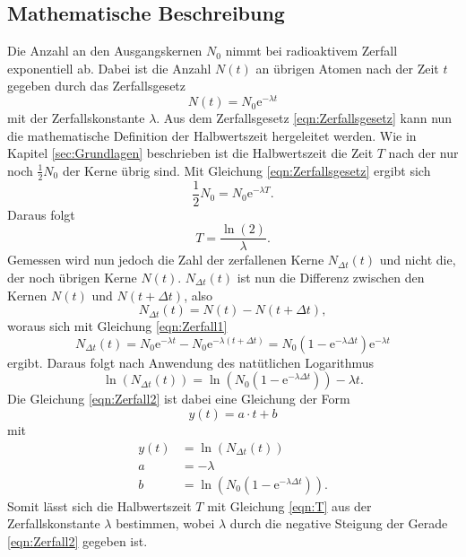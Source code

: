 \subsection{Mathematische Beschreibung}
\label{sec:mathe}
Die Anzahl an den Ausgangskernen $N_0$ nimmt bei radioaktivem Zerfall exponentiell ab. Dabei ist die 
Anzahl $N(t)$ an übrigen Atomen nach der Zeit $t$ gegeben durch das Zerfallsgesetz
\begin{equation}
    N(t)=N_0\text{e}^{-\lambda t} 
    \label{eqn:Zerfallsgesetz}
\end{equation}
mit der Zerfallskonstante $\lambda$. Aus dem Zerfallsgesetz \ref{eqn:Zerfallsgesetz} kann nun die mathematische
Definition der Halbwertszeit hergeleitet werden. Wie in Kapitel \ref{sec:Grundlagen} beschrieben ist die 
Halbwertszeit die Zeit $T$ nach der nur noch $\frac{1}{2}N_0$ der Kerne übrig sind. Mit Gleichung 
\ref{eqn:Zerfallsgesetz} ergibt sich
\begin{equation*}
    \frac{1}{2}N_0=N_0\text{e}^{-\lambda T}.
\end{equation*}
Daraus folgt 
\begin{equation}
    T=\frac{\ln(2)}{\lambda} 
    \label{eqn:T}.
\end{equation}
Gemessen wird nun jedoch die Zahl der zerfallenen Kerne $N_{\Delta t}(t)$ und nicht die, der noch übrigen
Kerne $N(t)$. $N_{\Delta t}(t)$ ist nun die Differenz zwischen den Kernen $N(t)$ und $N(t+\Delta t)$, 
also
\begin{equation*}
    N_{\Delta t}(t)=N(t)-N(t+\Delta t) 
    \label{eqn:Zerfall1},
\end{equation*}
woraus sich mit Gleichung \ref{eqn:Zerfall1}
\begin{equation*}
    N_{\Delta t}(t)=N_0\text{e}^{-\lambda t}-N_0\text{e}^{-\lambda (t+\Delta t)}
    =N_0(1-\text{e}^{-\lambda \Delta t})\text{e}^{-\lambda t}
\end{equation*}
ergibt. Daraus folgt nach Anwendung des natütlichen Logarithmus 
\begin{equation}
    \ln(N_{\Delta t}(t))
    =\ln(N_0(1-\text{e}^{-\lambda \Delta t}))-\lambda t 
    \label{eqn:Zerfall2}.
\end{equation}
Die Gleichung \ref{eqn:Zerfall2} ist dabei eine Gleichung der Form 
\begin{equation}
    y(t)=a\cdot t+b 
    \label{eqn:gerade}
\end{equation}
mit
\begin{align*}
    y(t)&=\ln(N_{\Delta t}(t))\\
    a&=-\lambda\\
    b&=\ln(N_0(1-\text{e}^{-\lambda \Delta t})).
\end{align*}
Somit lässt sich die Halbwertszeit $T$ mit Gleichung \ref{eqn:T} aus der Zerfallskonstante $\lambda$
bestimmen, wobei $\lambda$ durch die negative Steigung der Gerade \ref{eqn:Zerfall2} gegeben ist.
